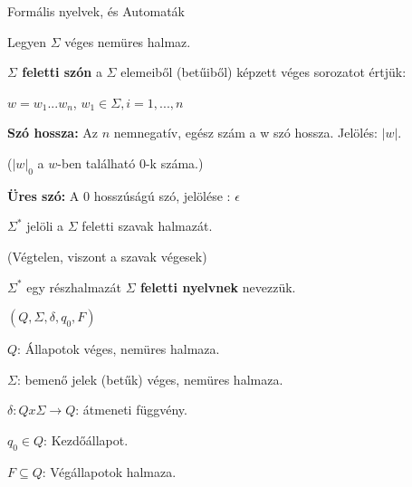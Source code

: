 \documentclass[10pt]{article}
\renewcommand{\\}{\par\noindent}
\begin{document}

\begin{frame}[plain]
\begin{tcolorbox}[center, colback={myyellow}, coltext={black}, colframe={myyellow}]
    {\Huge Formális nyelvek, és Automaták}
\end{tcolorbox}
\end{frame}


\begin{frame}
\begin{tcolorbox}[title={Def.: $\Sigma$ feletti szó}]
Legyen $\Sigma$ véges nemüres halmaz.\\
\medskip
\textbf{$\Sigma$ feletti szón} a $\Sigma$ elemeiből (betűiből) képzett véges sorozatot értjük: \\
\medskip
$w = w_1 ... w_n$, $w_1 \in {\Sigma}, i = 1, ..., n$\\
\medskip
\textbf{Szó hossza:} Az $n$ nemnegatív, egész szám a w szó hossza. Jelölés: $|w|$.\\
($|w|_0$ a $w$-ben található $0$-k száma.)\\
\medskip
\textbf{Üres szó:} A $0$ hosszúságú szó, jelölése : $\epsilon$\\
\medskip
${\Sigma}^*$ jelöli a $\Sigma$ feletti szavak halmazát.\\
(Végtelen, viszont a szavak végesek)
\end{tcolorbox}

\begin{tcolorbox}[title={Def.: $\Sigma$ feletti nyelv}]
${\Sigma}^*$ egy részhalmazát \textbf{$\Sigma$ feletti nyelvnek} nevezzük.
\end{tcolorbox}

\begin{tcolorbox}[title={Def.: Véges automata}]
\textbf{$(Q, {\Sigma}, {\delta}, q_0, F)$}\\
\medskip
$Q$: Állapotok véges, nemüres halmaza.\\
\medskip
$\Sigma$: bemenő jelek (betűk) véges, nemüres halmaza.\\
\medskip
$\delta : Q x \Sigma \rightarrow Q$: átmeneti függvény.\\
\medskip
$q_0 \in Q$: Kezdőállapot.\\
\medskip
$F \subseteq Q$: Végállapotok halmaza.\\
\end{tcolorbox}

\end{frame}
\end{document}
